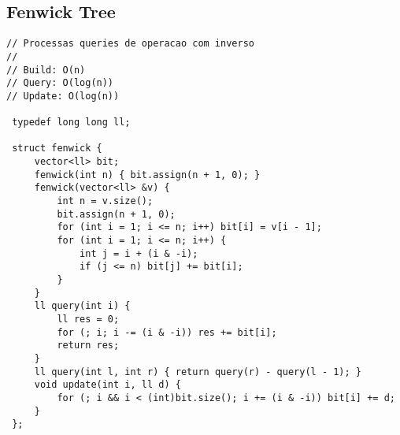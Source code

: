 \documentclass[11pt, a4paper, twoside]{article}
\begin{document}
\subsection{Fenwick Tree}
\begin{lstlisting}
// Processas queries de operacao com inverso
//
// Build: O(n)
// Query: O(log(n))
// Update: O(log(n))

 typedef long long ll;
 
 struct fenwick {
     vector<ll> bit;
     fenwick(int n) { bit.assign(n + 1, 0); }
     fenwick(vector<ll> &v) {
         int n = v.size();
         bit.assign(n + 1, 0);
         for (int i = 1; i <= n; i++) bit[i] = v[i - 1];
         for (int i = 1; i <= n; i++) {
             int j = i + (i & -i);
             if (j <= n) bit[j] += bit[i];
         }
     }
     ll query(int i) {
         ll res = 0;
         for (; i; i -= (i & -i)) res += bit[i];
         return res;
     }
     ll query(int l, int r) { return query(r) - query(l - 1); }
     void update(int i, ll d) {
         for (; i && i < (int)bit.size(); i += (i & -i)) bit[i] += d;
     }
 };
\end{lstlisting}
\end{document}
